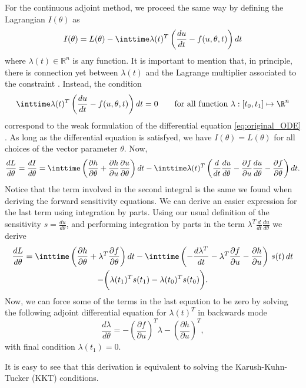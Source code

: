 For the continuous adjoint method, we proceed the same way by defining the Lagrangian $I(\theta)$ as 
\begin{equation}
    I(\theta) = L(\theta) - \inttime \lambda(t)^T \left( \frac{du}{dt} - f(u, \theta, t) \right) dt
\end{equation}
where $\lambda(t) \in \mathbb R^n$ is any function. 
It is important to mention that, in principle, there is connection yet between $\lambda (t)$ and the Lagrange multiplier associated to the constraint \cite{Givoli_2021}. 
Instead, the condition 
\begin{equation}
    \inttime \lambda(t)^T \left( \frac{du}{dt} - f(u, \theta, t) \right) dt = 0 \qquad \text{for all function } \lambda : [t_0, t_1] \mapsto \R^n
\end{equation}
correspond to the weak formulation of the differential equation \eqref{eq:original_ODE} \cite{brezis2011functional}.
As long as the differential equation is satisfyed, we have $I(\theta) = L(\theta)$ for all choices of the vector parameter $\theta$. 
Now, 
\begin{equation}
    \frac{dL}{d\theta} = \frac{dI}{d\theta} = 
    \inttime \left( \frac{\partial h}{\partial \theta} + \frac{\partial h}{\partial u} \frac{\partial u}{\partial \theta} \right) dt
    - 
    \inttime \lambda(t)^T \left( \frac{d}{dt} \frac{du}{d\theta} - \frac{\partial f}{\partial u} \frac{du}{d\theta} - \frac{\partial f}{\partial \theta} \right) dt.
\end{equation}
Notice that the term involved in the second integral is the same we found when deriving the forward sensitivity equations. 
We can derive an easier expression for the last term using integration by parts. 
Using our usual definition of the sensitivity $s = \frac{du}{d\theta}$, and performing integration by parts in the term $\lambda^T \frac{d}{dt} \frac{du}{d\theta}$ we derive 
\begin{multline}
    \frac{dL}{d\theta}
    = 
    \inttime \left( \frac{\partial h}{\partial \theta} + \lambda^T \frac{\partial f}{\partial \theta} \right) dt 
    - 
    \inttime \left( - \frac{d\lambda^T}{dt} - \lambda^T \frac{\partial f}{\partial u} - \frac{\partial h}{\partial u} \right) \, s(t) \, dt \\
    -
    \bigg ( \lambda(t_1)^T s(t_1) - \lambda(t_0)^T s(t_0) \bigg ).
    \label{eq:continous-adjoint-loss}
\end{multline}
Now, we can force some of the terms in the last equation to be zero by solving the following adjoint differential equation for $\lambda(t)^T$ in backwards mode
\begin{equation}
    \frac{d\lambda}{d\theta} = - \left(\frac{\partial f}{\partial u}\right)^T \lambda - \left( \frac{\partial h}{\partial u} \right)^T,
    \label{eq:continuous-adjoint}
\end{equation}
with final condition $\lambda(t_1) = 0$. 

It is easy to see that this derivation is equivalent to solving the Karush-Kuhn-Tucker (KKT) conditions. 

